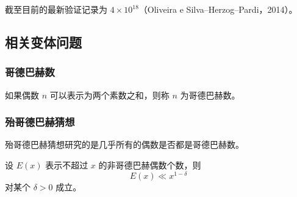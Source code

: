 截至目前的最新验证记录为 $4 \times 10^{18}$（Oliveira e Silva--Herzog--Pardi，2014）\cite{oliveira2014computational}。

\subsection{相关变体问题}

\subsubsection{哥德巴赫数}

\begin{definition}[哥德巴赫数]
    如果偶数 $n$ 可以表示为两个素数之和，则称 $n$ 为哥德巴赫数。
\end{definition}

\subsubsection{殆哥德巴赫猜想}

殆哥德巴赫猜想研究的是几乎所有的偶数是否都是哥德巴赫数。

\begin{theorem}[殆哥德巴赫猜想]
    设 $E(x)$ 表示不超过 $x$ 的非哥德巴赫偶数个数，则
    \begin{equation}
        E(x) \ll x^{1-\delta}
    \end{equation}
    对某个 $\delta > 0$ 成立。
\end{theorem}
